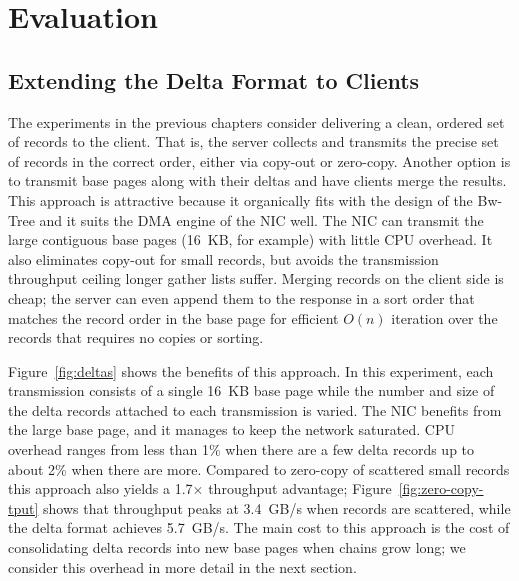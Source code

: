 



\section{Evaluation}

\subsection{Extending the Delta Format to Clients}

The experiments in the previous chapters consider delivering a clean, ordered set of records to the
client. That is, the server collects and transmits the precise set of records
in the correct order, either via copy-out or zero-copy. Another option is to
transmit base pages along with their deltas and have clients merge the results.
This approach is attractive because it organically fits with the design of the
Bw-Tree and it suits the DMA engine of the NIC well.  The NIC can transmit the
large contiguous base pages (16~KB, for example) with little CPU overhead.
It also eliminates copy-out for small records, but avoids the transmission
throughput ceiling longer gather lists suffer. %
Merging records on the client side is cheap; the server can even append them to
the response in a sort order that matches the record order in the base page for
efficient $O(n)$ iteration over the records that requires no copies or sorting.

Figure~\ref{fig:deltas} shows the benefits of this approach. In this
experiment, each transmission consists of a single 16~KB base page while the
number and size of the delta records attached to each transmission is varied.
The NIC benefits from the large base page, and it manages to keep the network
saturated. CPU overhead ranges from less than 1\% when there are a few delta
records up to about 2\% when there are more. Compared to zero-copy of scattered
small records this approach also yields a 1.7$\times$ throughput advantage;
Figure~\ref{fig:zero-copy-tput} shows that throughput peaks at 3.4~GB/s when
records are scattered, while the delta format achieves 5.7~GB/s.
The main cost to this approach is
the cost of consolidating delta records into new base pages when chains grow
long; we consider this overhead in more detail in the next section.

